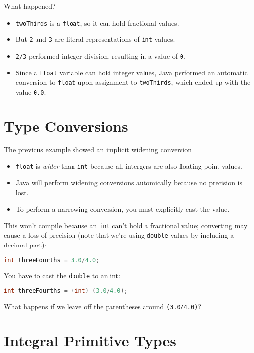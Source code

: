\documentclass{article}
\begin{document}
What happened?

\begin{itemize}
\item {\tt twoThirds} is a {\tt float}, so it can hold fractional values.
\item But {\tt 2} and {\tt 3} are literal representations of {\tt int} values.
\item {\tt 2/3} performed integer division, resulting in a value of {\tt 0}.
\item Since a {\tt float} variable can hold integer values, Java performed an automatic conversion to {\tt float} upon assignment to {\tt twoThirds}, which ended up with the value {\tt 0.0}.
\end{itemize}




\section{Type Conversions}


The previous example showed an implicit widening conversion
\begin{itemize}
\item {\tt float} is {\it wider} than {\tt int} because all intergers are also floating point values.
\item Java will perform widening conversions automically because no precision is lost.
\item To perform a narrowing conversion, you must explicitly cast the value.
\end{itemize}

This won't compile because an {\tt int} can't hold a fractional value; converting may cause a loss of precision (note that we're using {\tt double} values by including a decimal part):
\begin{lstlisting}[language=Java]
int threeFourths = 3.0/4.0;
\end{lstlisting}

You have to cast the {\tt double} to an int:

\begin{lstlisting}[language=Java]
int threeFourths = (int) (3.0/4.0);
\end{lstlisting}

What happens if we leave off the parentheses around {\tt (3.0/4.0)}?





\section{Integral Primitive Types}
\end{document}
